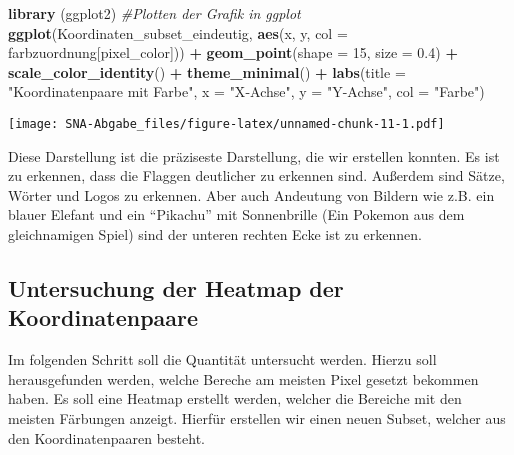 \documentclass[
]{article}
\newenvironment{Shaded}{\begin{snugshade}}{\end{snugshade}}
\newcommand{\AttributeTok}[1]{\textcolor[rgb]{0.13,0.29,0.53}{#1}}
\newcommand{\CommentTok}[1]{\textcolor[rgb]{0.56,0.35,0.01}{\textit{#1}}}
\newcommand{\DecValTok}[1]{\textcolor[rgb]{0.00,0.00,0.81}{#1}}
\newcommand{\FloatTok}[1]{\textcolor[rgb]{0.00,0.00,0.81}{#1}}
\newcommand{\FunctionTok}[1]{\textcolor[rgb]{0.13,0.29,0.53}{\textbf{#1}}}
\newcommand{\NormalTok}[1]{#1}
\newcommand{\SpecialCharTok}[1]{\textcolor[rgb]{0.81,0.36,0.00}{\textbf{#1}}}
\newcommand{\StringTok}[1]{\textcolor[rgb]{0.31,0.60,0.02}{#1}}
\begin{document}
\begin{Shaded}
\begin{Highlighting}[]
\FunctionTok{library}\NormalTok{ (ggplot2)}
\CommentTok{\#Plotten der Grafik in ggplot}
\FunctionTok{ggplot}\NormalTok{(Koordinaten\_subset\_eindeutig, }\FunctionTok{aes}\NormalTok{(x, y, }\AttributeTok{col =}\NormalTok{ farbzuordnung[pixel\_color])) }\SpecialCharTok{+}
  \FunctionTok{geom\_point}\NormalTok{(}\AttributeTok{shape =} \DecValTok{15}\NormalTok{, }\AttributeTok{size =} \FloatTok{0.4}\NormalTok{) }\SpecialCharTok{+}
  \FunctionTok{scale\_color\_identity}\NormalTok{() }\SpecialCharTok{+}
  \FunctionTok{theme\_minimal}\NormalTok{() }\SpecialCharTok{+}
  \FunctionTok{labs}\NormalTok{(}\AttributeTok{title =} \StringTok{"Koordinatenpaare mit Farbe"}\NormalTok{, }\AttributeTok{x =} \StringTok{"X{-}Achse"}\NormalTok{, }\AttributeTok{y =} \StringTok{"Y{-}Achse"}\NormalTok{, }\AttributeTok{col =} \StringTok{"Farbe"}\NormalTok{)}
\end{Highlighting}
\end{Shaded}

\texttt{[image: SNA-Abgabe\_files/figure-latex/unnamed-chunk-11-1.pdf]}

Diese Darstellung ist die präziseste Darstellung, die wir erstellen
konnten. Es ist zu erkennen, dass die Flaggen deutlicher zu erkennen
sind. Außerdem sind Sätze, Wörter und Logos zu erkennen. Aber auch
Andeutung von Bildern wie z.B. ein blauer Elefant und ein ``Pikachu''
mit Sonnenbrille (Ein Pokemon aus dem gleichnamigen Spiel) sind der
unteren rechten Ecke ist zu erkennen.

\subsection{Untersuchung der Heatmap der
Koordinatenpaare}\label{untersuchung-der-heatmap-der-koordinatenpaare}

Im folgenden Schritt soll die Quantität untersucht werden. Hierzu soll
herausgefunden werden, welche Bereche am meisten Pixel gesetzt bekommen
haben. Es soll eine Heatmap erstellt werden, welcher die Bereiche mit
den meisten Färbungen anzeigt. Hierfür erstellen wir einen neuen Subset,
welcher aus den Koordinatenpaaren besteht.
\end{document}
